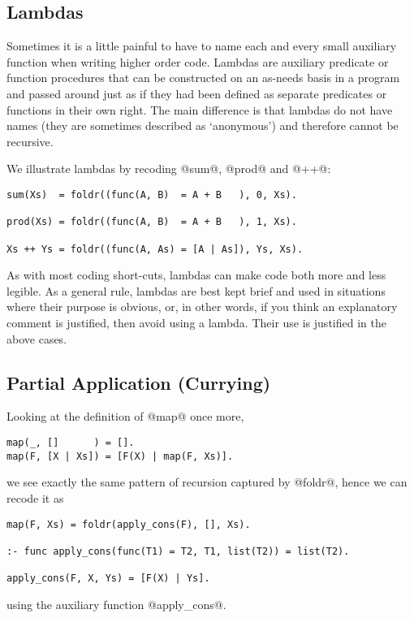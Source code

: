 \subsection{Lambdas}

Sometimes it is a little painful to have to name each and every small
auxiliary function when writing higher order code.  Lambdas are
auxiliary predicate or function procedures that can be constructed on an
as-needs basis in a program and passed around just as if they had been
defined as separate predicates or functions in their own right.  The
main difference is that lambdas do not have names (they are sometimes
described as `anonymous') and therefore cannot be recursive.

We illustrate lambdas by recoding @sum@, @prod@ and @++@:
\begin{verbatim}
sum(Xs)  = foldr((func(A, B)  = A + B   ), 0, Xs).

prod(Xs) = foldr((func(A, B)  = A + B   ), 1, Xs).

Xs ++ Ys = foldr((func(A, As) = [A | As]), Ys, Xs).
\end{verbatim}
As with most coding short-cuts, lambdas can make code both more and less
legible.  As a general rule, lambdas are best kept brief and used in
situations where their purpose is obvious, or, in other words, if you
think an explanatory comment is justified, then avoid using a lambda.
Their use is justified in the above cases.





\subsection{Partial Application (Currying)}

Looking at the definition of @map@ once more,
\begin{verbatim}
map(_, []      ) = [].
map(F, [X | Xs]) = [F(X) | map(F, Xs)].
\end{verbatim}
we see exactly the same pattern of recursion captured by @foldr@, hence
we can recode it as
\begin{verbatim}
map(F, Xs) = foldr(apply_cons(F), [], Xs).

:- func apply_cons(func(T1) = T2, T1, list(T2)) = list(T2).

apply_cons(F, X, Ys) = [F(X) | Ys].
\end{verbatim}
using the auxiliary function @apply_cons@.  

